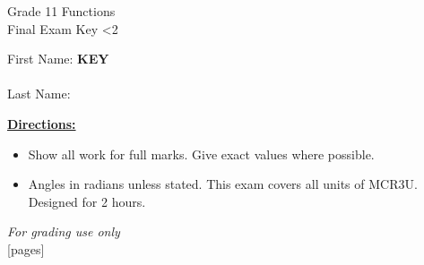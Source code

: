 \documentclass[addpoints]{exam}
\newcommand{\event}{Final Exam}
\newcommand{\tournament}{}
\def\type{0}
\begin{document}
\begin{center}
    {\huge Grade 11 Functions \\ \event
    \ifprintanswers \space Key
    \else \space \ifnum\type<2 \fi
    \fi \\ \vspace{3mm}\tournament\vspace{1mm}}
\end{center}

\vspace{.20\textheight}

\begin{center}
    First Name: \ifprintanswers
    \underline{\hspace{3.5cm}}\textbf{KEY}\underline{\hspace{5.5cm}}\\\vspace{5mm}
    \else \underline{\hspace{10cm}}\\ \vspace{5mm} \fi
    Last Name: \underline{\hspace{10cm}}\\ \vspace{5mm}
\end{center}

\noindent\textbf{\underline{Directions:}}
\begin{itemize}
    \item Show all work for full marks. Give exact values where possible.
    \item Angles in radians unless stated. This exam covers all units of MCR3U.
    Designed for 2 hours.
\end{itemize}
\begin{center}
\textit{For grading use only}\\
[pages]
\end{center}
\end{document}

